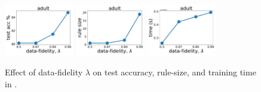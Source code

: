 \begin{figure}[t]
	\subfloat
	{\includegraphics[width=0.27\textwidth]{figures/interpretability/relaxed-cnf/adult_test_accuracy_vary_lambda.pdf}}
	\subfloat
	{\includegraphics[width=0.27\textwidth]{figures/interpretability/relaxed-cnf/adult_rule_size_vary_lambda.pdf}}
	\subfloat
	{\includegraphics[width=0.27\textwidth]{figures/interpretability/relaxed-cnf/adult_time_vary_lambda.pdf}} 
	\\
	

	\caption[Effect of data-fidelity $ \lambda $ in {\crr}]{Effect of data-fidelity $ \lambda $ on test accuracy, rule-size, and training time in {\crr}. } 
	\label{interpretability_crr_fig:result_lambda}
\end{figure}


